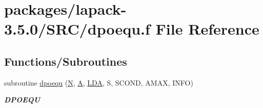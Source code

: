 \hypertarget{dpoequ_8f}{}\section{packages/lapack-\/3.5.0/\+S\+R\+C/dpoequ.f File Reference}
\label{dpoequ_8f}
\subsection*{Functions/\+Subroutines}
\begin{DoxyCompactItemize}
\item 
subroutine \hyperlink{group__doublePOcomputational_gae83b3e94a9fce827c8a7c547d134d9e6}{dpoequ} (\hyperlink{polmisc_8c_a0240ac851181b84ac374872dc5434ee4}{N}, \hyperlink{classA}{A}, \hyperlink{example__user_8c_ae946da542ce0db94dced19b2ecefd1aa}{L\+D\+A}, S, S\+C\+O\+N\+D, A\+M\+A\+X, I\+N\+F\+O)
\begin{DoxyCompactList}\small\item\em {\bfseries D\+P\+O\+E\+Q\+U} \end{DoxyCompactList}\end{DoxyCompactItemize}
